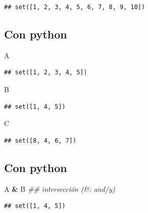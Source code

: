 \documentclass[]{book}
\newenvironment{Shaded}{\begin{snugshade}}{\end{snugshade}}
\newcommand{\CommentTok}[1]{\textcolor[rgb]{0.56,0.35,0.01}{\textit{#1}}}
\newcommand{\NormalTok}[1]{#1}
\newcommand{\OperatorTok}[1]{\textcolor[rgb]{0.81,0.36,0.00}{\textbf{#1}}}
\begin{document}
\begin{verbatim}
## set([1, 2, 3, 4, 5, 6, 7, 8, 9, 10])
\end{verbatim}

\hypertarget{con-python-1}{%
\subsection{Con python}\label{con-python-1}}

\begin{Shaded}
\begin{Highlighting}[]
\NormalTok{A}
\end{Highlighting}
\end{Shaded}

\begin{verbatim}
## set([1, 2, 3, 4, 5])
\end{verbatim}

\begin{Shaded}
\begin{Highlighting}[]
\NormalTok{B}
\end{Highlighting}
\end{Shaded}

\begin{verbatim}
## set([1, 4, 5])
\end{verbatim}

\begin{Shaded}
\begin{Highlighting}[]
\NormalTok{C}
\end{Highlighting}
\end{Shaded}

\begin{verbatim}
## set([8, 4, 6, 7])
\end{verbatim}

\hypertarget{con-python-2}{%
\subsection{Con python}\label{con-python-2}}

\begin{Shaded}
\begin{Highlighting}[]
\NormalTok{A }\OperatorTok{&}\NormalTok{ B   }\CommentTok{## intersección (&: and/y)}
\end{Highlighting}
\end{Shaded}

\begin{verbatim}
## set([1, 4, 5])
\end{verbatim}
\end{document}
